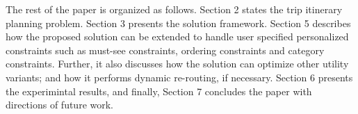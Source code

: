The rest of the paper is organized as follows. Section 2 states the trip itinerary planning problem. Section 3 presents the \trip solution framework. Section 5 describes how the proposed solution can be extended to handle user specified personalized constraints such as must-see constraints, ordering constraints and category constraints. Further, it also discusses how the \trip solution  can optimize other utility variants; and how it performs dynamic re-routing, if necessary. Section 6 presents the experimintal results, and finally, Section 7 concludes the paper with directions of future work.